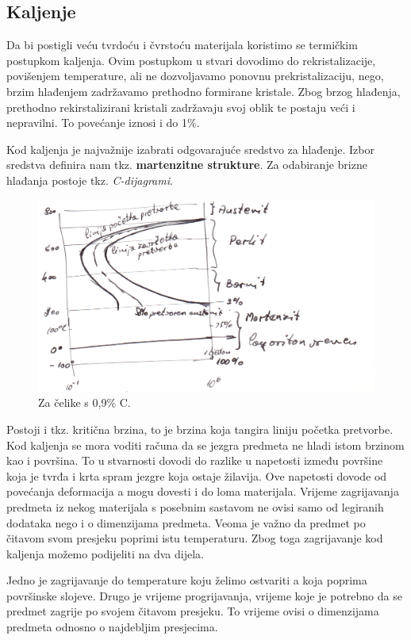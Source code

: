 \documentclass[a4paper,12pt]{article}
\numberwithin{figure}{section}
\begin{document}
\subsection{Kaljenje}
Da bi postigli veću tvrdoću i čvrstoću materijala koristimo se termičkim postupkom kaljenja. Ovim postupkom u stvari dovodimo do rekristalizacije, povišenjem temperature, ali ne dozvoljavamo ponovnu prekristalizaciju, nego, brzim hlađenjem zadržavamo prethodno formirane kristale. Zbog brzog hlađenja, prethodno rekirstalizirani kristali zadržavaju svoj oblik te postaju veći i nepravilni. To povećanje iznosi i do 1$\%$. \par
Kod kaljenja je najvažnije izabrati odgovarajuće sredstvo za hlađenje. Izbor sredstva definira nam tkz. \textbf{martenzitne strukture}. Za odabiranje brizne hlađanja postoje tkz. \textit{C-dijagrami}.
\begin{figure}[!h]
\centering
\includegraphics[scale=0.17]{image_65.png}
\caption{Za čelike s 0,9$\%$ C.}
\end{figure}
\FloatBarrier
Postoji i tkz. kritična brzina, to je brzina koja tangira liniju početka pretvorbe. Kod kaljenja se mora voditi računa da se jezgra predmeta ne hladi istom brzinom kao i površina. To u stvarnosti dovodi do razlike u napetosti između površine koja je tvrđa i krta spram jezgre koja ostaje žilavija. Ove napetosti dovode od povećanja deformacija a mogu dovesti i do loma materijala. Vrijeme zagrijavanja predmeta iz nekog materijala s posebnim sastavom ne ovisi samo od legiranih dodataka nego i o dimenzijama predmeta. Veoma je važno da predmet po čitavom svom presjeku poprimi istu temperaturu. Zbog toga zagrijavanje kod kaljenja možemo podijeliti na dva dijela.\par
Jedno je zagrijavanje do temperature koju želimo ostvariti a koja poprima površinske slojeve. Drugo je vrijeme progrijavanja, vrijeme koje je potrebno da se predmet zagrije po svojem čitavom presjeku. To vrijeme ovisi o dimenzijama predmeta odnosno o najdebljim presjecima.\par 
\end{document}

